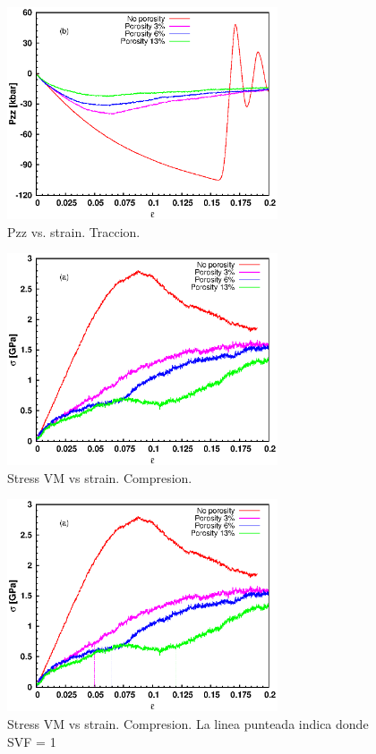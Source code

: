 \documentclass[10pt, oneside]{article} %
\begin{document}
\begin{figure}[H]
\centering
\includegraphics[width=8cm]{Figures/porosity_Pzz_strain_tens.eps}
\caption{Pzz vs. strain. Traccion.}
\end{figure}


\begin{figure}[H]
\centering
\includegraphics[width=8cm]{Figures/porosity_stress_strain_comp.eps}
\caption{Stress VM vs strain. Compresion.}
\end{figure}

\begin{figure}[H]
\centering
\includegraphics[width=8cm]{Figures/porosity_stress_strain_comp_dash.eps}
\caption{Stress VM vs strain. Compresion. La linea punteada indica donde SVF = 1}
\end{figure}
\end{document}
